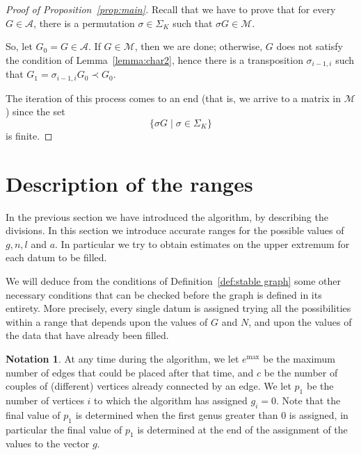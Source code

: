 \documentclass{amsart}
\theoremstyle{plain}
\theoremstyle{definition}
\newtheorem{notation}[theorem]{Notation}
\DeclareMathOperator{\MAX}{max}
\begin{document}
\begin{proof}[Proof of Proposition~\ref{prop:main}]
  Recall that we have to prove that for every $G \in \mathcal{A}$,
  there is a permutation $\sigma \in \Sigma_K$ such that $\sigma G \in
  \mathcal{M}$.

  So, let $G_0 = G \in \mathcal{A}$. If $G \in \mathcal{M}$, then we
  are done; otherwise, $G$ does not satisfy the condition of
  Lemma~\ref{lemma:char2}, hence there is a transposition
  $\sigma_{i-1, i}$ such that $G_1 = \sigma_{i-1,i} G_0 \prec G_0$.

  The iteration of this process comes to an end (that is, we arrive to
  a matrix in $\mathcal{M}$) since the set
  \[
  \bigl\{ \sigma G \mid \sigma \in \Sigma_K\bigr\}
  \]
  is finite.
\end{proof}



\section{Description of the ranges}\label{sec:ranges}

In the previous section we have introduced the algorithm, by
describing the divisions. In this section we introduce accurate ranges
for the possible values of $g,n,l$ and $a$. In particular we try to
obtain estimates on the upper extremum for each datum to be filled.

We will deduce from the
conditions of Definition~\ref{def:stable graph} some other necessary
conditions that can be checked before the graph is defined in its
entirety. More precisely, every single datum is assigned trying all
the possibilities within a range that depends upon the values of $G$
and $N$, and upon the values of the data that have already been
filled.


\begin{notation}
  At any time during the algorithm, we let $e^{\MAX}$ be the maximum
  number of edges that could be placed after that time, and $c$ be the
  number of couples of (different) vertices already connected by an
  edge. We let $p_1$ be the number of vertices $i$ to which the
  algorithm has assigned $g_i = 0$. Note that the final value of $p_1$
  is determined when the first genus greater than $0$ is assigned, in
  particular the final value of $p_1$ is determined at the end of the
  assignment of the values to the vector $g$.
\end{notation}
\end{document}
